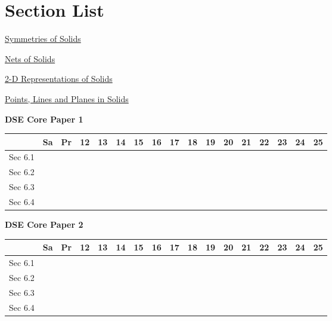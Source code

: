 \documentclass[12pt, a4paper]{article}
\begin{document}
\section*{Section List}
\begin{enumx}[label=Sec 6.\arabic*\ ]
\item \hyperref[section:3-6-1]{Symmetries of Solids}
\item \hyperref[section:3-6-2]{Nets of Solids}
\item \hyperref[section:3-6-3]{2-D Representations of Solids}
\item \hyperref[section:3-6-4]{Points, Lines and Planes in Solids}
\end{enumx}
\begin{absolutelynopagebreak}
\begin{center}
\textbf{DSE Core Paper 1}
\end{center}
\begin{center}
\begin{tabular}{|l|c|c|c|c|c|c|c|c|c|c|c|c|c|c|c|c|}
\hline
        & Sa & Pr & 12 & 13 & 14 & 15 & 16 & 17 & 18 & 19 & 20 & 21 & 22 & 23 & 24 & 25 \\\hline\hline
Sec 6.1 &  &  &  &  &  &  &  &  &  &  &  &  &  &  &  &  \\\hline
Sec 6.2 &  &  &  &  &  &  &  &  &  &  &  &  &  &  &  &  \\\hline
Sec 6.3 &  &  &  &  &  &  &  &  &  &  &  &  &  &  &  &  \\\hline
Sec 6.4 &  &  &  &  &  &  &  &  &  &  &  &  &  &  &  &  \\\hline
\end{tabular}
\end{center}
\end{absolutelynopagebreak}
\begin{absolutelynopagebreak}
\begin{center}
\textbf{DSE Core Paper 2}
\end{center}
\begin{center}
\begin{tabular}{|l|c|c|c|c|c|c|c|c|c|c|c|c|c|c|c|c|}
\hline
        & Sa & Pr & 12 & 13 & 14 & 15 & 16 & 17 & 18 & 19 & 20 & 21 & 22 & 23 & 24 & 25 \\\hline\hline
Sec 6.1 &  &  &  &  &  &  &  &  &  &  &  &  &  &  &  &  \\\hline
Sec 6.2 &  &  &  &  &  &  &  &  &  &  &  &  &  &  &  &  \\\hline
Sec 6.3 &  &  &  &  &  &  &  &  &  &  &  &  &  &  &  &  \\\hline
Sec 6.4 &  &  &  &  &  &  &  &  &  &  &  &  &  &  &  &  \\\hline
\end{tabular}
\end{center}
\end{absolutelynopagebreak}
\end{document}
